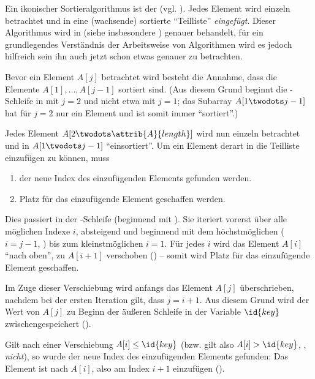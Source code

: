 Ein ikonischer Sortieralgorithmus ist der  (vgl. \cite[74]{taocp3}). Jedes Element wird einzeln betrachtet und in eine (wachsende) sortierte \enquote{Teilliste} \emph{eingefügt}. Dieser Algorithmus wird in  (siehe insbesondere ) genauer behandelt, für ein grundlegendes Verständnis der Arbeitsweise von Algorithmen wird es jedoch hilfreich sein ihn auch jetzt schon etwas genauer zu betrachten.



Bevor ein Element $A[j]$ betrachtet wird besteht die Annahme, dass die Elemente $A[1], \ldots, A[j - 1]$ sortiert sind. (Aus diesem Grund beginnt die \For-Schleife in  mit $j = 2$ und nicht etwa mit $j = 1$; das Subarray $A[1 \twodots j - 1]$ hat für $j = 2$ nur ein Element und ist somit immer \enquote{sortiert}.)

Jedes Element $A[2 \twodots \attrib{A}{length}]$ wird nun einzeln betrachtet und in $A[1 \twodots j - 1]$ \enquote{einsortiert}. Um ein Element derart in die Teilliste einzufügen zu können, muss
\begin{enumerate}[nosep, label=(\alph*)]
    \item der neue Index des einzufügenden Elements gefunden werden.
    \item Platz für das einzufügende Element geschaffen werden.
\end{enumerate}
Dies passiert in der \While-Schleife (beginnend mit ). Sie iteriert vorerst über alle möglichen Indexe $i$, absteigend und beginnend mit dem höchstmöglichen ($i = j - 1$, ) bis zum kleinstmöglichen $i = 1$. Für jedes $i$ wird das Element $A[i]$ \enquote{nach oben}, zu $A[i + 1]$ verschoben () -- somit wird Platz für das einzufügende Element geschaffen. 

Im Zuge dieser Verschiebung wird anfangs das Element $A[j]$ überschrieben, nachdem bei der ersten Iteration gilt, dass $j = i + 1$. Aus diesem Grund wird der Wert von $A[j]$ zu Beginn der äußeren Schleife in der Variable $\id{key}$ zwischengespeichert ().

Gilt nach einer Verschiebung $A[i] \leq \id{key}$ (bzw. gilt also $A[i] > \id{key}$, , \emph{nicht}), so wurde der neue Index des einzufügenden Elements gefunden: Das Element ist nach $A[i]$, also am Index $i + 1$ einzufügen ().

